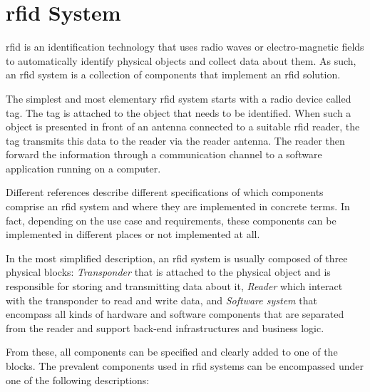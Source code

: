 \section{\ac{rfid} System}


\ac{rfid} is an identification technology that uses radio waves or electro-magnetic fields to automatically identify physical objects and collect data about them.
As such, an \ac{rfid} system is a collection of components that implement an \ac{rfid} solution.

The simplest and most elementary \ac{rfid} system starts with a radio device called tag. The tag is attached to the object that needs to be identified. When such a object is presented in front of an antenna connected to a suitable \ac{rfid} reader, the tag transmits this data to the reader via the reader antenna. The reader then forward the information through a communication channel to a software application running on a computer.

Different references describe different specifications of which components comprise an \ac{rfid} system and where they are implemented in concrete terms.
In fact, depending on the use case and requirements, these components can be implemented in different places or not implemented at all.

In the most simplified description, an \ac{rfid} system is usually composed of three physical blocks: \emph{Transponder} that is attached to the physical object and is responsible for storing and transmitting data about it, \emph{Reader} which interact with the transponder to read and write data, and \emph{Software system} that encompass all kinds of hardware and software components that are separated from the reader and support back-end infrastructures and business logic.

From these, all components can be specified and clearly added to one of the blocks.
The prevalent components used in \ac{rfid} systems can be encompassed under one of the following descriptions:

